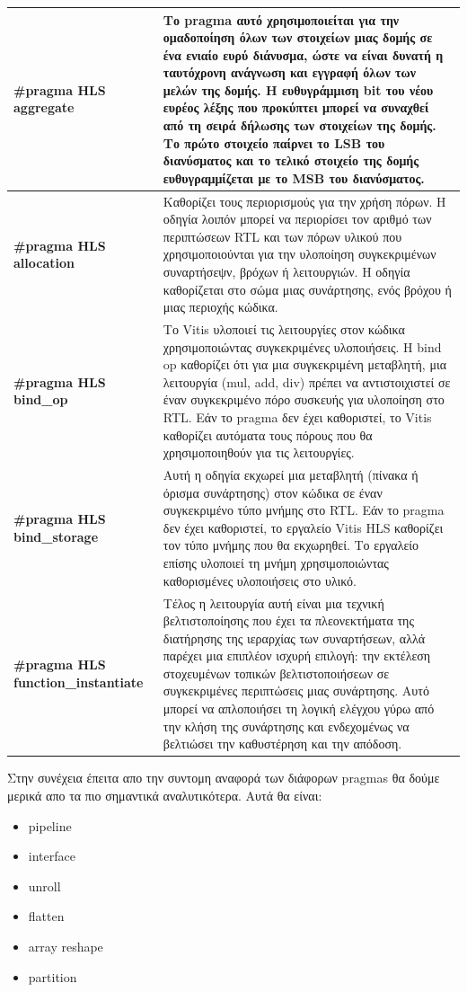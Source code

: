 \begin{longtable}{|p{4cm}|p{10cm}|}
  \hline
  \textbf{\#pragma HLS aggregate} & Το pragma αυτό χρησιμοποιείται για την ομαδοποίηση όλων των στοιχείων μιας δομής
  σε ένα ενιαίο ευρύ διάνυσμα, ώστε να είναι δυνατή η ταυτόχρονη ανάγνωση και εγγραφή όλων των μελών της δομής.
  Η ευθυγράμμιση bit του νέου ευρέος λέξης που προκύπτει μπορεί να συναχθεί από τη σειρά δήλωσης των στοιχείων της δομής.
  Το πρώτο στοιχείο παίρνει το LSB του διανύσματος και το τελικό στοιχείο της δομής ευθυγραμμίζεται με το MSB του διανύσματος. \\
  \hline
  \textbf{\#pragma HLS allocation} & Καθορίζει τους περιορισμούς για την χρήση πόρων. Η οδηγία λοιπόν μπορεί να περιορίσει τον αριθμό των
  περιπτώσεων RTL και των πόρων υλικού που χρησιμοποιούνται για την υλοποίηση συγκεκριμένων συναρτήσεψν, βρόχων ή λειτουργιών. Η οδηγία καθορίζεται στο σώμα μιας συνάρτησης, ενός βρόχου ή μιας περιοχής κώδικα.\\
  \hline
  \textbf{\#pragma HLS bind\_op} & Το Vitis υλοποιεί τις λειτουργίες στον κώδικα χρησιμοποιώντας συγκεκριμένες υλοποιήσεις.
  H bind op καθορίζει ότι για μια συγκεκριμένη μεταβλητή, μια λειτουργία (mul, add, div) πρέπει να αντιστοιχιστεί σε έναν συγκεκριμένο πόρο συσκευής για υλοποίηση στο RTL.
  Εάν το pragma δεν έχει καθοριστεί, το Vitis καθορίζει αυτόματα τους πόρους που θα χρησιμοποιηθούν για τις λειτουργίες.\\
  \hline
  \textbf{\#pragma HLS bind\_storage} & Αυτή η οδηγία εκχωρεί μια μεταβλητή (πίνακα ή όρισμα συνάρτησης) στον κώδικα σε έναν συγκεκριμένο τύπο μνήμης στο RTL.
  Εάν το pragma δεν έχει καθοριστεί, το εργαλείο Vitis HLS καθορίζει τον τύπο μνήμης που θα εκχωρηθεί. Το εργαλείο επίσης υλοποιεί τη μνήμη χρησιμοποιώντας καθορισμένες υλοποιήσεις στο υλικό. \\
  \hline
  \textbf{\#pragma HLS function\_instantiate} & Τέλος η λειτουργία αυτή είναι μια τεχνική βελτιστοποίησης που έχει τα πλεονεκτήματα της διατήρησης της ιεραρχίας των συναρτήσεων,
  αλλά παρέχει μια επιπλέον ισχυρή επιλογή: την εκτέλεση στοχευμένων τοπικών βελτιστοποιήσεων σε συγκεκριμένες περιπτώσεις μιας συνάρτησης.
  Αυτό μπορεί να απλοποιήσει τη λογική ελέγχου γύρω από την κλήση της συνάρτησης και ενδεχομένως να βελτιώσει την καθυστέρηση και την απόδοση. \\
  \hline
\end{longtable}

Στην συνέχεια έπειτα απο την συντομη αναφορά των διάφορων pragmas θα δούμε μερικά απο τα πιο σημαντικά αναλυτικότερα. Αυτά θα είναι:
\begin{itemize}
  \item pipeline
  \item interface
  \item unroll
  \item flatten
  \item array reshape
  \item partition
\end{itemize}


